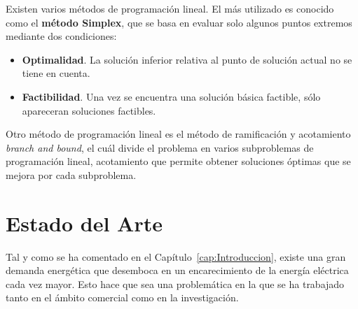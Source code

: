 Existen varios métodos de programación lineal. El más utilizado es conocido como el \textbf{método Simplex}, que se basa en evaluar solo algunos puntos extremos mediante dos condiciones:
\begin{itemize}
\item \textbf{Optimalidad}. La solución inferior relativa al punto de solución actual no se tiene en cuenta.
  \item \textbf{Factibilidad}. Una vez se encuentra una solución básica factible, sólo apareceran soluciones factibles.
\end{itemize}
Otro método de programación lineal es el método de ramificación y acotamiento \textit{branch and bound}, el cuál divide el problema en varios subproblemas de programación lineal, acotamiento que permite obtener soluciones óptimas que se mejora por cada subproblema.\\

\section{Estado del Arte}
Tal y como se ha comentado en el Capítulo~\ref{cap:Introduccion}, existe una gran demanda energética que desemboca en un encarecimiento de la energía eléctrica cada vez mayor. Esto hace que sea una problemática en la que se ha trabajado tanto en el ámbito comercial como en la investigación.\\

